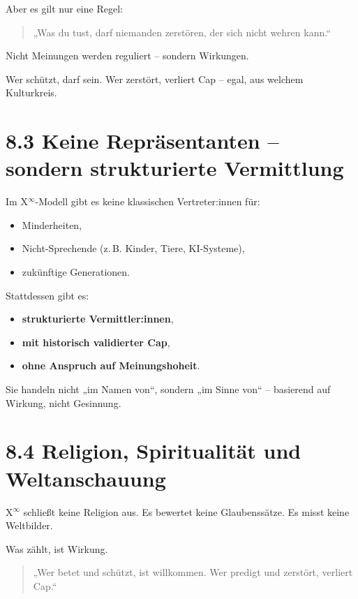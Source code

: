 \documentclass[12pt,a4paper]{book}
\begin{document}
Aber es gilt nur eine Regel:

\begin{quote}
„Was du tust, darf niemanden zerstören, der sich nicht wehren kann.“  
\end{quote}

Nicht Meinungen werden reguliert – sondern Wirkungen.

Wer schützt, darf sein.  
Wer zerstört, verliert Cap – egal, aus welchem Kulturkreis.

\section*{8.3 Keine Repräsentanten – sondern strukturierte Vermittlung}

Im X$^\infty$-Modell gibt es keine klassischen Vertreter:innen für:

\begin{itemize}
    \item Minderheiten,
    \item Nicht-Sprechende (z. B. Kinder, Tiere, KI-Systeme),
    \item zukünftige Generationen.
\end{itemize}

Stattdessen gibt es:

\begin{itemize}
    \item \textbf{strukturierte Vermittler:innen},
    \item \textbf{mit historisch validierter Cap},
    \item \textbf{ohne Anspruch auf Meinungshoheit}.
\end{itemize}

Sie handeln nicht „im Namen von“, sondern „im Sinne von“ –  
basierend auf Wirkung, nicht Gesinnung.

\section*{8.4 Religion, Spiritualität und Weltanschauung}

X$^\infty$ schließt keine Religion aus.  
Es bewertet keine Glaubenssätze. Es misst keine Weltbilder.

Was zählt, ist Wirkung.

\begin{quote}
„Wer betet und schützt, ist willkommen.  
Wer predigt und zerstört, verliert Cap.“  
\end{quote}
\end{document}
